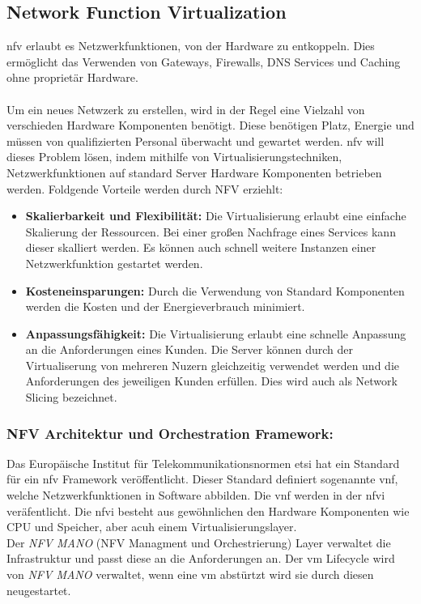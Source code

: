 \documentclass[runningheads]{llncs}
\numberwithin{figure}{section}
\begin{document}
\subsection{Network Function Virtualization}
\label{subsec:Network Function Virtualization}
\acrfull{nfv} erlaubt es Netzwerkfunktionen, von der Hardware zu entkoppeln.
Dies ermöglicht das Verwenden von Gateways, Firewalls, DNS Services und Caching ohne proprietär Hardware.
\\
\\
Um ein neues Netwzerk zu erstellen, wird in der Regel eine Vielzahl von verschieden Hardware Komponenten benötigt. 
Diese benötigen Platz, Energie und müssen von qualifizierten Personal überwacht und gewartet werden. 
\acrlong{nfv} will dieses Problem lösen, indem mithilfe von Virtualisierungstechniken, Netzwerkfunktionen auf standard
Server Hardware Komponenten betrieben werden. 
Foldgende Vorteile werden durch NFV erziehlt: \cite{nfv_wp}
\begin{itemize}
  \item \textbf{Skalierbarkeit und Flexibilität:} Die Virtualisierung erlaubt eine einfache Skalierung der Ressourcen.
  Bei einer großen Nachfrage eines Services kann dieser skalliert werden. Es können auch schnell weitere Instanzen einer Netzwerkfunktion gestartet werden.
  \item \textbf{Kosteneinsparungen:} Durch die Verwendung von Standard Komponenten werden die Kosten und der Energieverbrauch minimiert.
  \item \textbf{Anpassungsfähigkeit:} Die Virtualisierung erlaubt eine schnelle Anpassung an die Anforderungen eines Kunden. 
  Die Server können durch der Virtualiserung von mehreren Nuzern gleichzeitig verwendet werden und die Anforderungen des jeweiligen
  Kunden erfüllen. Dies wird auch als Network Slicing bezeichnet.
\end{itemize}


\subsubsection{NFV Architektur und Orchestration Framework:}
Das Europäische Institut für Telekommunikationsnormen \acrshort{etsi} hat ein Standard für ein \acrshort{nfv} Framework veröffentlicht.
Dieser Standard definiert sogenannte \acrfull{vnf}, welche Netzwerkfunktionen in Software abbilden.
Die \acrshort{vnf} werden in der \acrfull{nfvi} veräfentlicht. Die \acrshort{nfvi} besteht aus gewöhnlichen
den Hardware Komponenten wie CPU und Speicher, aber acuh einem Virtualisierungslayer. \\
Der \textit{NFV MANO} (NFV Managment und Orchestrierung) Layer verwaltet die Infrastruktur und passt diese an die Anforderungen an.
Der \acrfull{vm} Lifecycle wird von \textit{NFV MANO} verwaltet, wenn eine \acrshort{vm} abstürtzt wird sie durch diesen neugestartet.
\end{document}
